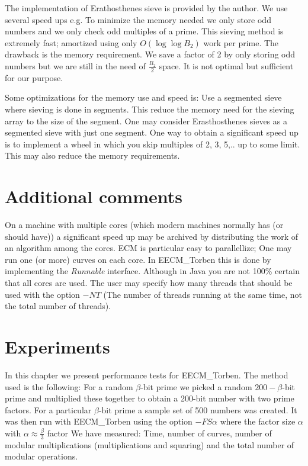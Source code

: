 The implementation of Erathosthenes sieve is provided by the author. We use several speed ups e.g. To minimize the memory needed we only store odd numbers and we only check odd multiples of a prime. This sieving method is extremely fast; amortized using only $O(\log\log B_2)$ work per prime. The drawback is the memory requirement. We save a factor of 2 by only storing odd numbers but we are still in the need of $\frac{B_2}{2}$ space. It is not optimal but sufficient for our purpose. 

Some optimizations for the memory use and speed is: Use a segmented sieve where sieving is done in segments. This reduce the memory need for the sieving array to the size of the segment. One may consider Erasthosthenes sieves as a segmented sieve with just one segment. One way to obtain a significant speed up is to implement a wheel in which you skip multiples of 2, 3, 5,.. up to some limit. This may also reduce the memory requirements. 

\section{Additional comments}
On a machine with multiple cores (which modern machines normally has (or should have)) a significant speed up may be archived by distributing the work of an algorithm among the cores. ECM is particular easy to parallellize; One may run one (or more) curves on each core. In EECM\_Torben this is done by implementing the \textit{Runnable} interface. Although in Java you are not 100\% certain that all cores are used. The user may specify how many threads that should be used with the option $-NT$ (The number of threads running at the same time, not the total number of threads).   

\section{Experiments}\label{sec:experimentsEdward}
In this chapter we present performance tests for EECM\_Torben. The method used is the following: For a random $\beta$-bit prime we picked a random $200-\beta$-bit prime and multiplied these together to obtain a 200-bit number with two prime factors. For a particular $\beta$-bit prime a sample set of 500 numbers was created. It was then run with EECM\_Torben using the option $-FS\alpha$ where the factor size $\alpha$ with $\alpha \approx \frac{\beta}{3}$ factor 
We have measured: Time, number of curves, number of modular multiplications (multiplications and squaring) and the total number of modular operations. 

